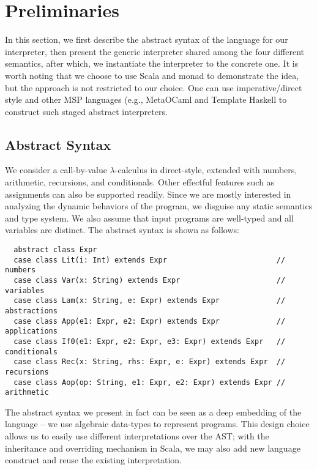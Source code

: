 \newcommand{\TLang}{$L_\lambda$}

\section{Preliminaries} \label{prelim}

In this section, we first describe the abstract syntax of the language for our interpreter, 
then present the generic interpreter shared among the four different
semantics, after which, we instantiate the interpreter to the concrete one.
It is worth noting that we choose to use Scala and monad to demonstrate the
idea, but the approach is not restricted to our choice. One can use
imperative/direct style and other MSP languages (e.g., MetaOCaml
\cite{DBLP:conf/gpce/CalcagnoTHL03, DBLP:conf/flops/Kiselyov14} and Template
Haskell \cite{Sheard:2002:TMH:636517.636528} to construct such staged abstract
interpreters.

\subsection{Abstract Syntax} \label{bg_lang}

We consider a call-by-value $\lambda$-calculus in direct-style, extended
with numbers, arithmetic, recursions, and conditionals. Other effectful features
such as assignments can also be supported readily.
Since we are mostly interested in analyzing the dynamic behaviors of the
program, we disguise any static semantics and type system. We also assume that
input programs are well-typed and all variables are distinct. The abstract
syntax is shown as follows:

\begin{lstlisting}
  abstract class Expr
  case class Lit(i: Int) extends Expr                         // numbers
  case class Var(x: String) extends Expr                      // variables
  case class Lam(x: String, e: Expr) extends Expr             // abstractions
  case class App(e1: Expr, e2: Expr) extends Expr             // applications
  case class If0(e1: Expr, e2: Expr, e3: Expr) extends Expr   // conditionals
  case class Rec(x: String, rhs: Expr, e: Expr) extends Expr  // recursions
  case class Aop(op: String, e1: Expr, e2: Expr) extends Expr // arithmetic
\end{lstlisting}

The abstract syntax we present in fact can be seen as a deep embedding of the
language -- we use algebraic data-types to represent programs. This design choice allows us to
easily use different interpretations over the AST; with the inheritance and
overriding mechanism in Scala, we may also add new language construct and reuse
the existing interpretation.

